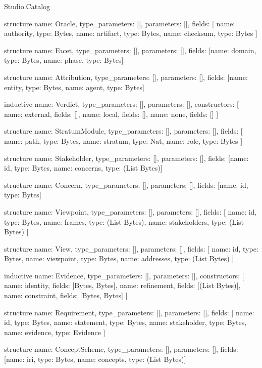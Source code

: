 \begin{lexlean}{Studio.Catalog}
\begin{semanticmodule}
structure{
  name: Oracle,
  type_parameters: [],
  parameters: [],
  fields: [
    {name: authority, type: Bytes},
    {name: artifact, type: Bytes},
    {name: checksum, type: Bytes}
  ]
}

structure{
  name: Facet,
  type_parameters: [],
  parameters: [],
  fields: [{name: domain, type: Bytes}, {name: phase, type: Bytes}]
}

structure{
  name: Attribution,
  type_parameters: [],
  parameters: [],
  fields: [{name: entity, type: Bytes}, {name: agent, type: Bytes}]
}

inductive{
  name: Verdict,
  type_parameters: [],
  parameters: [],
  constructors: [
    {name: external, fields: []},
    {name: local, fields: []},
    {name: none, fields: []}
  ]
}

structure{
  name: StratumModule,
  type_parameters: [],
  parameters: [],
  fields: [
    {name: path, type: Bytes},
    {name: stratum, type: Nat},
    {name: role, type: Bytes}
  ]
}

structure{
  name: Stakeholder,
  type_parameters: [],
  parameters: [],
  fields: [{name: id, type: Bytes}, {name: concerns, type: (List Bytes)}]
}

structure{
  name: Concern,
  type_parameters: [],
  parameters: [],
  fields: [{name: id, type: Bytes}]
}

structure{
  name: Viewpoint,
  type_parameters: [],
  parameters: [],
  fields: [
    {name: id, type: Bytes},
    {name: frames, type: (List Bytes)},
    {name: stakeholders, type: (List Bytes)}
  ]
}

structure{
  name: View,
  type_parameters: [],
  parameters: [],
  fields: [
    {name: id, type: Bytes},
    {name: viewpoint, type: Bytes},
    {name: addresses, type: (List Bytes)}
  ]
}

inductive{
  name: Evidence,
  type_parameters: [],
  parameters: [],
  constructors: [
    {name: identity, fields: [Bytes, Bytes]},
    {name: refinement, fields: [(List Bytes)]},
    {name: constraint, fields: [Bytes, Bytes]}
  ]
}

structure{
  name: Requirement,
  type_parameters: [],
  parameters: [],
  fields: [
    {name: id, type: Bytes},
    {name: statement, type: Bytes},
    {name: stakeholder, type: Bytes},
    {name: evidence, type: Evidence}
  ]
}

structure{
  name: ConceptScheme,
  type_parameters: [],
  parameters: [],
  fields: [{name: iri, type: Bytes}, {name: concepts, type: (List Bytes)}]
}


\end{semanticmodule}
\end{lexlean}
